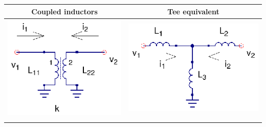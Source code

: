 \begin{table}[H]
  \centering
  \begin{tabular}{ | c | c | }
    \hline
    Coupled inductors & Tee equivalent\\ \hline
    \begin{minipage}{.4\textwidth}
      \includegraphics[width=\linewidth]{coupled-inductors}
    \end{minipage}
    &
    \begin{minipage}{.4\textwidth}
      \includegraphics[width=\linewidth]{coupled-inductors-tee-equivalent}
    \end{minipage}
\\ \hline
    \begin{minipage}{.4\textwidth}

\end{minipage}
\end{tabular}
\end{table}
